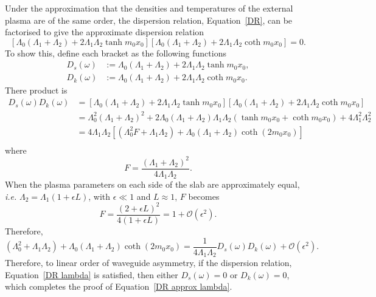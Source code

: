 \documentclass[12pt,draft]{../style-files/ociamthesis}
\begin{document}
Under the approximation that the densities and temperatures of the external plasma are of the same order, the dispersion relation, Equation~\eqref{DR}, can be factorised to give the approximate dispersion relation
\begin{equation}
\left[\Lambda_0(\Lambda_1+\Lambda_2)+2\Lambda_1\Lambda_2\tanh{m_0x_0}\right]\left[\Lambda_0(\Lambda_1+\Lambda_2)+2\Lambda_1\Lambda_2\coth{m_0x_0}\right]=0. \label{DR approx lambda}
\end{equation}
To show this, define each bracket as the following functions
\begin{align}
D_s(\omega) &:= \Lambda_0(\Lambda_1 + \Lambda_2) + 2\Lambda_1\Lambda_2\tanh{m_0x_0}, \\
D_k(\omega) &:= \Lambda_0 (\Lambda_1 + \Lambda_2) + 2\Lambda_1\Lambda_2\coth{m_0x_0}.
\end{align}
There product is
\begin{align}
D_s(\omega)D_k(\omega) &= \left[ \Lambda_0(\Lambda_1 + \Lambda_2) + 2\Lambda_1\Lambda_2\tanh{m_0x_0} \right] \left[ \Lambda_0 (\Lambda_1 + \Lambda_2) + 2\Lambda_1\Lambda_2\coth{m_0x_0} \right] \\
&= \Lambda_0^2 (\Lambda_1 + \Lambda_2)^2 + 2\Lambda_0(\Lambda_1 + \Lambda_2)\Lambda_1\Lambda_2(\tanh{m_0x_0} + \coth{m_0x_0}) + 4\Lambda_1^2\Lambda_2^2 \\
&= 4\Lambda_1\Lambda_2 \left[ (\Lambda_0^2F + \Lambda_1\Lambda_2) + \Lambda_0(\Lambda_1 + \Lambda_2)\coth(2m_0x_0) \right] \\
\end{align}
where
\begin{equation}
F = \frac{(\Lambda_1 + \Lambda_2)^2}{4\Lambda_1\Lambda_2}.
\end{equation}
When the plasma parameters on each side of the slab are approximately equal, \textit{i.e.} $\Lambda_2 = \Lambda_1 (1 + \epsilon L)$, with $\epsilon \ll 1$ and $L \approx 1$, $F$ becomes
\begin{equation}
F = \frac{(2 + \epsilon L)^2}{4(1 + \epsilon L)} = 1 + \mathcal{O}(\epsilon^2).
\end{equation}
Therefore, 
\begin{equation}
(\Lambda_0^2 + \Lambda_1\Lambda_2) + \Lambda_0(\Lambda_1 + \Lambda_2)\coth(2m_0x_0) = \frac{1}{4\Lambda_1\Lambda_2} D_s(\omega) D_k(\omega) + \mathcal{O}(\epsilon^2).
\end{equation}
Therefore, to linear order of waveguide asymmetry, if the dispersion relation, Equation~\eqref{DR lambda} is satisfied, then either $D_s(\omega) = 0$ or $D_k(\omega) = 0$, which completes the proof of Equation~\eqref{DR approx lambda}.
\end{document}
